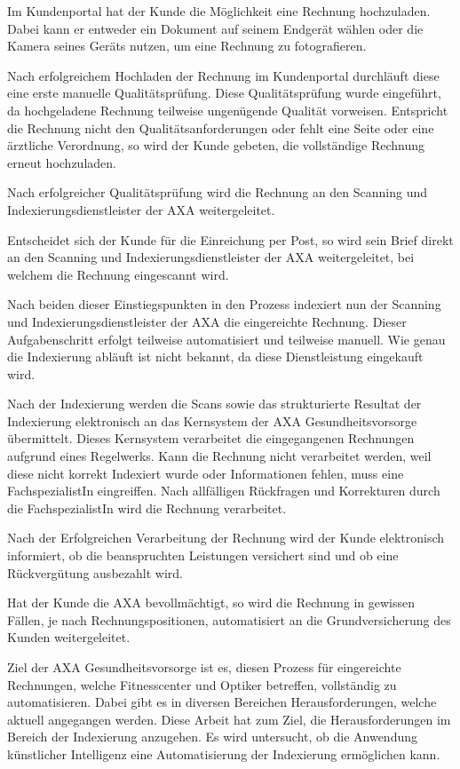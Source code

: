 
Im Kundenportal hat der Kunde die Möglichkeit eine Rechnung hochzuladen. Dabei kann er entweder ein Dokument auf seinem Endgerät wählen oder die Kamera seines Geräts nutzen, um eine Rechnung zu fotografieren.

Nach erfolgreichem Hochladen der Rechnung im Kundenportal durchläuft diese eine erste manuelle Qualitätsprüfung. Diese Qualitätsprüfung wurde eingeführt, da hochgeladene Rechnung teilweise ungenügende Qualität vorweisen. Entspricht die Rechnung nicht den Qualitätsanforderungen oder fehlt eine Seite oder eine ärztliche Verordnung, so wird der Kunde gebeten, die vollständige Rechnung erneut hochzuladen.

Nach erfolgreicher Qualitätsprüfung wird die Rechnung an den Scanning und Indexierungsdienstleister der AXA weitergeleitet.

Entscheidet sich der Kunde für die Einreichung per Post, so wird sein Brief direkt an den Scanning und Indexierungsdienstleister der AXA weitergeleitet, bei welchem die Rechnung eingescannt wird.

Nach beiden dieser Einstiegspunkten in den Prozess indexiert nun der Scanning und Indexierungsdienstleister der AXA die eingereichte Rechnung. Dieser Aufgabenschritt erfolgt teilweise automatisiert und teilweise manuell. Wie genau die Indexierung abläuft ist nicht bekannt, da diese Dienstleistung eingekauft wird.

Nach der Indexierung werden die Scans sowie das strukturierte Resultat der Indexierung elektronisch an das Kernsystem der AXA Gesundheitsvorsorge übermittelt. Dieses Kern\-system verarbeitet die eingegangenen Rechnungen aufgrund eines Regelwerks. Kann die Rechnung nicht verarbeitet werden, weil diese nicht korrekt Indexiert wurde oder Informationen fehlen, muss eine FachspezialistIn eingreiffen. Nach allfälligen Rückfragen und Korrekturen durch die FachspezialistIn wird die Rechnung verarbeitet. 

Nach der Erfolgreichen Verarbeitung der Rechnung wird der Kunde elektronisch informiert, ob die beanspruchten Leistungen versichert sind und ob eine Rückvergütung ausbezahlt wird.

Hat der Kunde die AXA bevollmächtigt, so wird die Rechnung in gewissen Fällen, je nach Rechnungspositionen, automatisiert an die Grundversicherung des Kunden weitergeleitet. 

Ziel der AXA Gesundheitsvorsorge ist es, diesen Prozess für eingereichte Rechnungen, welche Fitnesscenter und Optiker betreffen, vollständig zu automatisieren. Dabei gibt es in diversen Bereichen Herausforderungen, welche aktuell angegangen werden. Diese Arbeit hat zum Ziel, die Herausforderungen im Bereich der Indexierung anzugehen. Es wird untersucht, ob die Anwendung künstlicher Intelligenz eine Automatisierung der Indexierung ermöglichen kann.


